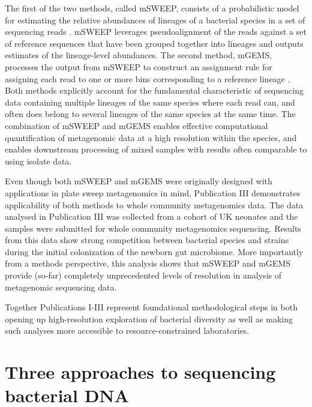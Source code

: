 \documentclass[officiallayout]{tktla}
\begin{document}
The first of the two methods, called mSWEEP, consists of a
probabilistic model for estimating the relative abundances of lineages
of a bacterial species in a set of sequencing reads
\citep{maklin_high-resolution_2021}. mSWEEP leverages pseudoalignment
\citep{bray2016near} of the reads against a set of reference sequences
that have been grouped together into lineages and outputs estimates of
the lineage-level abundances. The second method, mGEMS, processes the
output from mSWEEP to construct an assignment rule for assigning each
read to one or more bins corresponding to a reference lineage
\citep{maklin_bacterial_2021}. Both methods explicitly account for the
fundamental characteristic of sequencing data containing multiple lineages of the same species where
each read can, and often does belong to several lineages of the same
species at the same time. The combination of mSWEEP and mGEMS enables
effective computational quantification of metagenomic data at a high
resolution within the species, and enables downstream processing of
mixed samples with results often comparable to using isolate data.

Even though both mSWEEP and mGEMS were originally designed with
applications in plate sweep metagenomics in mind, Publication III
\citep{maklin_strong_2022} demonstrates applicability of both methods
to whole community metagenomics data. The data analysed in Publication
III was collected from a cohort of UK neonates
\citep{shao2019stunted} and the samples were submitted for whole community metagenomics sequencing. Results from this data show strong
competition between bacterial species and strains during the initial
colonization of the newborn gut microbiome. More importantly from a
methods perspective, this analysis shows that mSWEEP and mGEMS provide
(so-far) completely unprecedented levels of resolution in analysis of
metagenomic sequencing data.

Together Publications I-III represent foundational
methodological steps in both opening up high-resolution exploration of
bacterial diversity as well as making such analyses more accessible to
resource-constrained laboratories.

\section{Three approaches to sequencing bacterial DNA}
\label{three-approaches-to-metagenomics}

\end{document}
